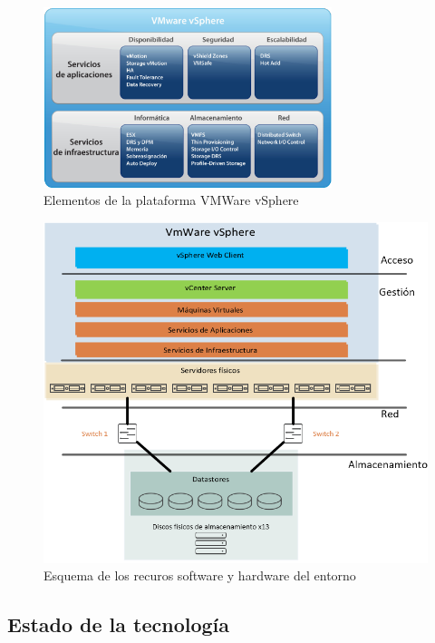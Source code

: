 \begin{figure}[hp]
  \centering
  \includegraphics[width=0.75\textwidth]{imaxes/cap2recursos/contentVSphere}
  \caption{Elementos de la plataforma VMWare vSphere\cite{fotovSphere}}
  \label{fig:componentesVSphere}
\end{figure}
\begin{figure}[hp]
  \centering
  \includegraphics[width=1\textwidth]{imaxes/cap2recursos/recursosReal.png}
  \caption{Esquema de los recuros software y hardware del entorno}
  \label{fig:esquemaentornoreal}
\end{figure}

\FloatBarrier
\subsection{Estado de la tecnología}

